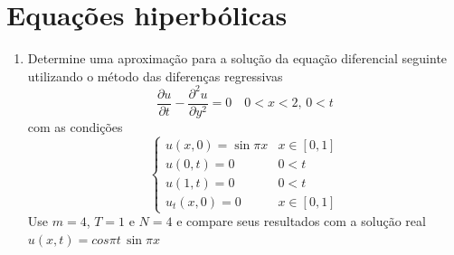 \documentclass[a4paper, 11pt]{report}
\begin{document}
\section{Equações hiperbólicas}
\begin{enumerate}[leftmargin=*]
    \item Determine uma aproximação para a solução da equação diferencial seguinte utilizando o método das diferenças regressivas
    \[
    \dfrac{\partial u}{\partial t} - \dfrac{\partial^2 u}{\partial y^2} = 0 \quad 0 < x < 2, \, 0 < t
    \]
    com as condições
    \[
        \left\{  
            \begin{array}{ll}
                u(x,0) = \sin \pi x & x \in [0,1]\\  
                u(0,t) = 0 & 0 < t\\
                u(1,t) = 0 & 0 < t\\
                u_t(x,0) = 0 & x \in [0,1]
            \end{array}
        \right.
    \]
    Use $m = 4$, $T = 1$ e $N = 4$ e compare seus resultados com a solução real $u(x,t) = cos \pi t \, \sin \pi x$
    

\end{enumerate}
\end{document}
